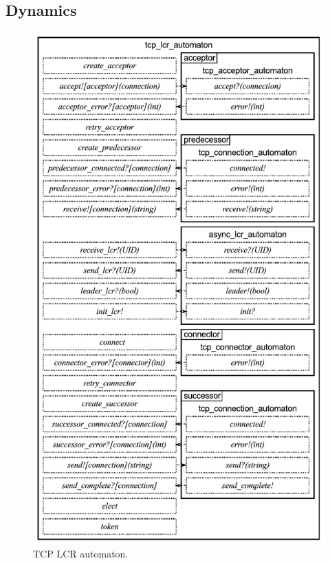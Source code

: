 \subsection{Dynamics}

\begin{figure}
\center
\includegraphics[width=\textwidth]{tcp_lcr_automaton}
\caption{TCP LCR automaton.}
\label{tcp_lcr_automaton}
\end{figure}

